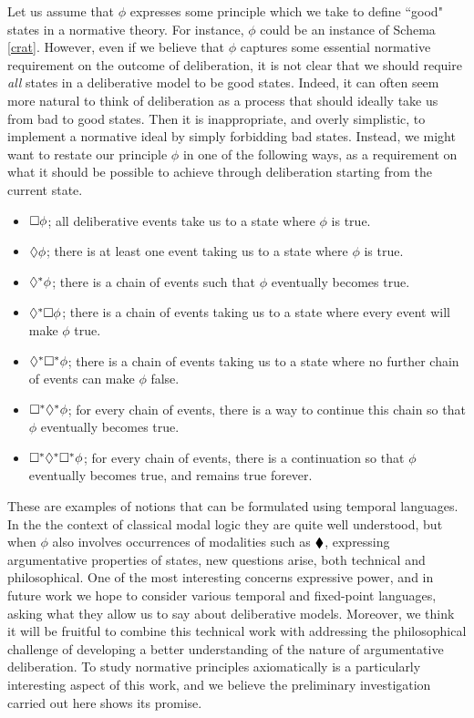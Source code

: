\documentclass[greybox]{svmult}
\begin{document}
Let us assume that $\phi$ expresses some principle which we take to define ``good" states in a normative theory. For instance, $\phi$ could be an instance of Schema \ref{crat}. However, even if we believe that $\phi$ captures some essential normative requirement on the outcome of deliberation, it is not clear that we should require \emph{all} states in a deliberative model to be good states. Indeed, it can often seem more natural to think of deliberation as a process that should ideally take us from bad to good states. Then it is inappropriate, and overly simplistic, to implement a normative ideal by simply forbidding bad states. Instead, we might want to restate our principle $\phi$ in one of the following ways, as a requirement on what it should be possible to achieve through deliberation starting from the current state.

\begin{itemize}
\item $\square \phi$; all deliberative events take us to a state where $\phi$ is true.
\item $\lozenge \phi$; there is at least one event taking us to a state where $\phi$ is true.
\item $\lozenge^\ast \phi$; there is a chain of events such that $\phi$ eventually becomes true.
\item $\lozenge^\ast \square \phi$; there is a chain of events taking us to a state where every event will make $\phi$ true.
\item $\lozenge^\ast \square^\ast \phi$; there is a chain of events taking us to a state where no further chain of events can make $\phi$ false.
\item $\square^\ast \lozenge^\ast \phi$; for every chain of events, there is a way to continue this chain so that $\phi$ eventually becomes true.
\item $\square^\ast \lozenge^\ast \square^\ast \phi$; for every chain of events, there is a continuation so that $\phi$ eventually becomes true, and remains true forever.
\end{itemize}

These are examples of notions that can be formulated using temporal languages. In the the context of classical modal logic they are quite well understood, but when $\phi$ also involves occurrences of modalities such as $\blacklozenge$, expressing argumentative properties of states, new questions arise, both technical and philosophical. One of the most interesting concerns expressive power, and in future work we hope to consider various temporal and fixed-point languages, asking what they allow us to say about deliberative models. Moreover, we think it will be fruitful to combine this technical work with addressing the philosophical challenge of developing a better understanding of the nature of argumentative deliberation. To study normative principles axiomatically is a particularly interesting aspect of this work, and we believe the preliminary investigation carried out here shows its promise.
\end{document}
